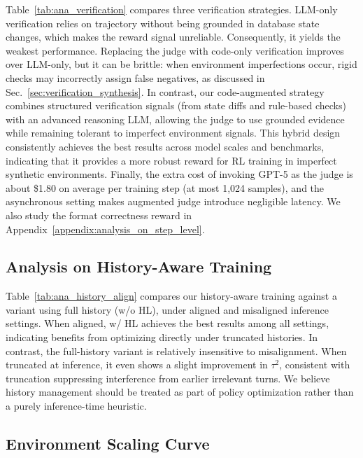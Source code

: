 \documentclass{article}
\theoremstyle{plain}
\theoremstyle{definition}
\theoremstyle{remark}
\newcommand{\synth}{\textls{\textsc{AWM}}\xspace}
\begin{document}
Table~\ref{tab:ana_verification} compares three verification strategies.
LLM-only verification relies on trajectory without being grounded in database state changes, which makes the reward signal unreliable. Consequently, it yields the weakest performance.
Replacing the judge with code-only verification improves over LLM-only, but it can be brittle: when environment imperfections occur, rigid checks may incorrectly assign false negatives, as discussed in Sec.~\ref{sec:verification_synthesis}.
In contrast, our code-augmented strategy combines structured verification signals (from state diffs and rule-based checks) with an advanced reasoning LLM, allowing the judge to use grounded evidence while remaining tolerant to imperfect environment signals.
This hybrid design consistently achieves the best results across model scales and benchmarks, indicating that it provides a more robust reward for RL training in imperfect synthetic environments.
Finally, the extra cost of invoking GPT-5 as the judge is about \$1.80 on average per training step (at most 1,024 samples), and the asynchronous setting makes augmented judge introduce negligible latency.
We also study the format correctness reward in Appendix~\ref{appendix:analysis_on_step_level}.





\subsection{Analysis on History-Aware Training}



Table~\ref{tab:ana_history_align} compares our history-aware training against a variant using full history (w/o HL), under aligned and misaligned inference settings.
When aligned, \synth w/ HL achieves the best results among all settings, indicating benefits from optimizing directly under truncated histories.
In contrast, the full-history variant is relatively insensitive to misalignment. When truncated at inference, it even shows a slight improvement in $\tau^2$, consistent with truncation suppressing interference from earlier irrelevant turns.
We believe history management should be treated as part of policy optimization rather than a purely inference-time heuristic.


\subsection{Environment Scaling Curve}
\end{document}
